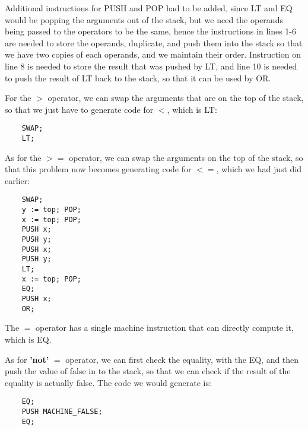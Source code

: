 \documentclass{article}
\begin{document}
Additional instructions for PUSH and POP had to be added, since LT and EQ would be popping the arguments out of the stack, but we need the operands being passed to the operators to be the same, hence the instructions in lines 1-6 are needed to store the operands, duplicate, and push them into the stack so that we have two copies of each operands, and we maintain their order. Instruction on line 8 is needed to store the result that was pushed by LT, and line 10 is needed to push the result of LT back to the stack, so that it can be used by OR.

For the $>$ operator, we can swap the arguments that are on the top of the stack, so that we just have to generate code for $<$, which is LT:

\begin{lstlisting}
    SWAP;
    LT;
\end{lstlisting}

As for the $>=$ operator, we can swap the arguments on the top of the stack, so that this problem now becomes generating code for $<=$, which we had just did earlier:

\begin{lstlisting}
    SWAP;
    y := top; POP;
    x := top; POP;
    PUSH x;
    PUSH y;
    PUSH x;
    PUSH y;
    LT;
    x := top; POP;
    EQ;
    PUSH x;
    OR;
\end{lstlisting}

The $=$ operator has a single machine instruction that can directly compute it, which is EQ.

As for \textbf{'not'} $=$ operator, we can first check the equality, with the EQ, and then push the value of false in to the stack, so that we can check if the result of the equality is actually false. The code we would generate is:

\begin{lstlisting}
    EQ;
    PUSH MACHINE_FALSE;
    EQ;
\end{lstlisting}
\end{document}
